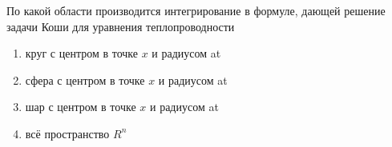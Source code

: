 По какой области производится интегрирование в формуле, дающей решение задачи Коши для уравнения теплопроводности

\begin{enumerate}[label=\arabic*)]
    \item круг с центром в точке \(x\) и радиусом at
    \item сфера с центром в точке \(x\) и радиусом at
    \item шар с центром в точке \(x\) и радиусом at
    \item всё пространство \(R^n\)
\end{enumerate}

